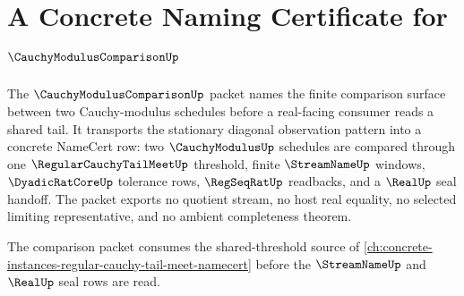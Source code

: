 \chapter{A Concrete Naming Certificate for $\CauchyModulusComparisonUp$}
\label{ch:concrete-instances-cauchymoduluscomparison-namecert}

The $\CauchyModulusComparisonUp$ packet names the finite comparison surface between two Cauchy-modulus schedules before a real-facing consumer reads a shared tail. It transports the stationary diagonal observation pattern into a concrete NameCert row: two $\CauchyModulusUp$ schedules are compared through one $\RegularCauchyTailMeetUp$ threshold, finite $\StreamNameUp$ windows, $\DyadicRatCoreUp$ tolerance rows, $\RegSeqRatUp$ readbacks, and a $\RealUp$ seal handoff. The packet exports no quotient stream, no host real equality, no selected limiting representative, and no ambient completeness theorem.

The comparison packet consumes the shared-threshold source of \autoref{ch:concrete-instances-regular-cauchy-tail-meet-namecert} before the $\StreamNameUp$ and $\RealUp$ seal rows are read.

